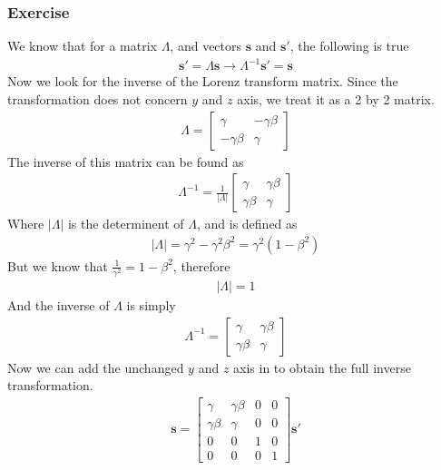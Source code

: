 \documentclass[12pt]{book}
\newcommand{\paren}[1]{\left( #1 \right)}
\newcommand{\abso}[1]{\left|#1 \right|}
\newcommand{\then}{\rightarrow}
\begin{document}
\subsubsection{Exercise}
We know that for a matrix $\Lambda$, and vectors $\mathbf{s}$ and $\mathbf{s}'$, the following is true
\begin{align}
\mathbf{s}' = \Lambda\mathbf{s} \then \Lambda^{-1}\mathbf{s}'=\mathbf{s}
\end{align}
Now we look for the inverse of the Lorenz transform matrix. Since the transformation does not concern $y$ and $z$ axis, we treat it as a 2 by 2 matrix.
\begin{align}
\Lambda = \begin{bmatrix}
    \gamma & -\gamma\beta\\
    -\gamma\beta & \gamma
\end{bmatrix}
\end{align}
The inverse of this matrix can be found as
\begin{align}
\Lambda^{-1} = \frac{1}{\abso{\Lambda}}\begin{bmatrix}
    \gamma & \gamma\beta\\
    \gamma\beta & \gamma
\end{bmatrix}
\end{align}
Where $\abso{\Lambda}$ is the determinent of $\Lambda$, and is defined as
\begin{align}
\abso{\Lambda} = \gamma^2 -\gamma^2\beta^2 = \gamma^2\paren{1-\beta^2}
\end{align}
But we know that $\frac{1}{\gamma^2} = 1 - \beta^2$, therefore
\begin{align}
\abso{\Lambda} = 1
\end{align}
And the inverse of $\Lambda$ is simply 
\begin{align}
\Lambda^{-1} =\begin{bmatrix}
    \gamma & \gamma\beta\\
    \gamma\beta & \gamma
\end{bmatrix}
\end{align}
Now we can add the unchanged $y$ and $z$ axis in to obtain the full inverse transformation.
\begin{align}
\mathbf{s} = \begin{bmatrix}
    \gamma & \gamma\beta & 0 & 0\\
    \gamma\beta & \gamma & 0 & 0\\
    0&0&1&0\\
    0&0&0&1
\end{bmatrix}\mathbf{s}'
\end{align}
\end{document}
